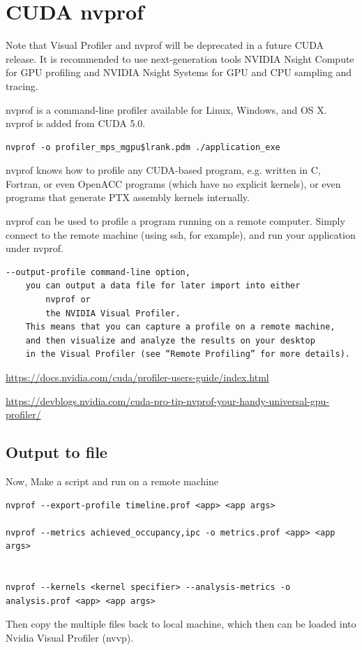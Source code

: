  
\section{CUDA {\bf nvprof}}
\label{sec:nvprof}
\label{sec:profiler-nvprof}

Note that Visual Profiler and nvprof will be deprecated in a future CUDA
release. It is recommended to use next-generation tools NVIDIA Nsight Compute
for GPU profiling and NVIDIA Nsight Systems for GPU and CPU sampling and
tracing.

nvprof is a command-line profiler available for Linux, Windows, and OS X.
nvprof is added from CUDA 5.0.

\begin{verbatim}
nvprof -o profiler_mps_mgpu$lrank.pdm ./application_exe
\end{verbatim}


nvprof knows how to profile any CUDA-based program, e.g. written in C, Fortran,
or even OpenACC programs (which have no explicit kernels), or even programs that
generate PTX assembly kernels internally.
 
nvprof can be used to profile a program running on a remote computer.
Simply connect to the remote machine (using ssh, for example), and run your
application under nvprof.
\begin{verbatim}
--output-profile command-line option, 
	you can output a data file for later import into either 
		nvprof or 
		the NVIDIA Visual Profiler. 
	This means that you can capture a profile on a remote machine, 
	and then visualize and analyze the results on your desktop 
	in the Visual Profiler (see “Remote Profiling” for more details).

\end{verbatim}

\url{https://docs.nvidia.com/cuda/profiler-users-guide/index.html}

\url{https://devblogs.nvidia.com/cuda-pro-tip-nvprof-your-handy-universal-gpu-profiler/}

\subsection{Output to file}




Now, Make a script and run on a remote machine
\begin{verbatim}
nvprof --export-profile timeline.prof <app> <app args>

nvprof --metrics achieved_occupancy,ipc -o metrics.prof <app> <app args> 


nvprof --kernels <kernel specifier> --analysis-metrics -o analysis.prof <app> <app args> 

\end{verbatim}
Then copy the multiple files back to local machine, which then can be loaded
into Nvidia Visual Profiler (nvvp).

